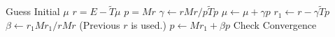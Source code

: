 \documentclass[preview=true]{standalone}
\begin{document}
\begin{algorithmic}
\State Guess Initial $\mu$
\State $r = E - \tilde{T}\mu$
\State $p = M r$
   \State $\gamma \gets r M r / p \tilde{T} p$
   \State $\mu    \gets \mu + \gamma p$
   \State $r_1    \gets r - \gamma \tilde{T} p$ 
   \State $\beta  \gets r_1 M r_1 / r M r$ (Previous $r$ is used.)
   \State $p      \gets M r_1 + \beta p$
   \State Check Convergence
\EndWhile
\EndProcedure
\end{algorithmic}
\end{document}
